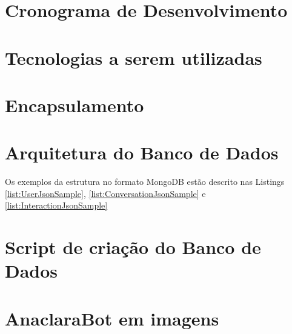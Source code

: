 \documentclass[12pt]{report}
\begin{document}


\section*{Cronograma de Desenvolvimento}



\newpage
\section*{Tecnologias a serem utilizadas}



\section*{Encapsulamento}




\newpage
\section*{Arquitetura do Banco de Dados}
\setlength{\parindent}{10ex}



\newpage
\par Os exemplos da estrutura no formato MongoDB estão descrito nas Listings \ref{list:UserJsonSample}, \ref{list:ConversationJsonSample} e \ref{list:InteractionJsonSample}



\newpage
\section*{Script de criação do Banco de Dados}
\setlength{\parindent}{10ex}



\newpage
\section*{AnaclaraBot em imagens}
\setlength{\parindent}{10ex}
\end{document}
